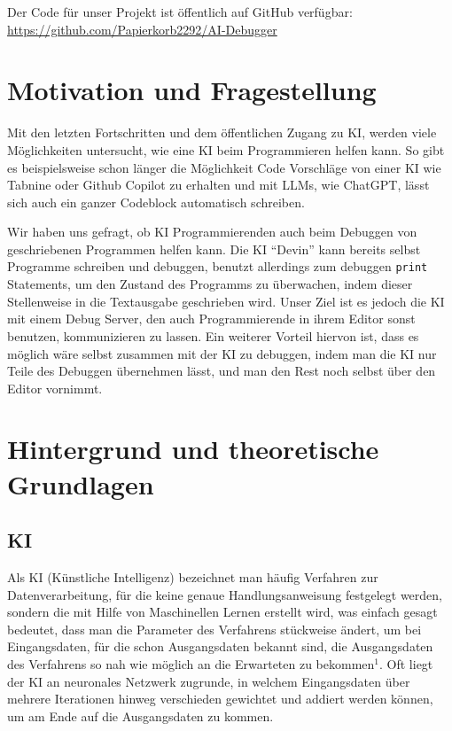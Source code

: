 \documentclass[a4paper,12pt,ngerman]{scrartcl}
\begin{document}
Der Code für unser Projekt ist öffentlich auf GitHub verfügbar: \url{https://github.com/Papierkorb2292/AI-Debugger}

\section{Motivation und Fragestellung}

Mit den letzten Fortschritten und dem öffentlichen Zugang zu KI, werden viele Möglichkeiten untersucht, wie eine KI beim Programmieren helfen kann. So gibt es beispielsweise schon länger die Möglichkeit Code Vorschläge von einer KI wie Tabnine oder Github Copilot zu erhalten und mit LLMs, wie ChatGPT, lässt sich auch ein ganzer Codeblock automatisch schreiben.

Wir haben uns gefragt, ob KI Programmierenden auch beim Debuggen von geschriebenen Programmen helfen kann. Die KI ``Devin'' kann bereits selbst Programme schreiben und debuggen, benutzt allerdings zum debuggen \texttt{print} Statements, um den Zustand des Programms zu überwachen, indem dieser Stellenweise in die Textausgabe geschrieben wird. Unser Ziel ist es jedoch die KI mit einem Debug Server, den auch Programmierende in ihrem Editor sonst benutzen, kommunizieren zu lassen. Ein weiterer Vorteil hiervon ist, dass es möglich wäre selbst zusammen mit der KI zu debuggen, indem man die KI nur Teile des Debuggen übernehmen lässt, und man den Rest noch selbst über den Editor vornimmt.

\section{Hintergrund und theoretische Grundlagen}

\subsection{KI}

Als KI (Künstliche Intelligenz) bezeichnet man häufig Verfahren zur Datenverarbeitung, für die keine genaue Handlungsanweisung festgelegt werden, sondern die mit Hilfe von Maschinellen Lernen erstellt wird, was einfach gesagt bedeutet, dass man die Parameter des Verfahrens stückweise ändert, um bei Eingangsdaten, für die schon Ausgangsdaten bekannt sind, die Ausgangsdaten des Verfahrens so nah wie möglich an die Erwarteten zu bekommen$^1$. Oft liegt der KI an neuronales Netzwerk zugrunde, in welchem Eingangsdaten über mehrere Iterationen hinweg verschieden gewichtet und addiert werden können, um am Ende auf die Ausgangsdaten zu kommen.
\end{document}
